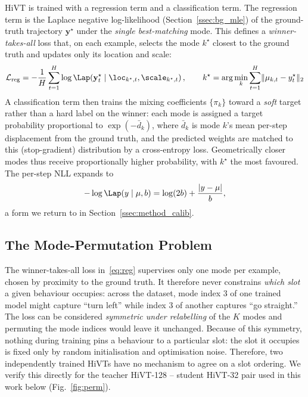 HiVT is trained with a regression term and a classification term. The regression
term is the Laplace negative log-likelihood (Section~\ref{ssec:bg_mle}) of the
ground-truth trajectory $\mathbf{y}^\star$ under the \emph{single best-matching}
mode. This defines a \emph{winner-takes-all} loss that, on each example, selects the mode
$k^\star$ closest to the ground truth and updates only its location and scale:
\begin{equation}
  \label{eq:reg}
  \mathcal{L}_{\mathrm{reg}}
    = -\frac{1}{H}\sum_{t=1}^{H}
       \log \Lap\!\left(\mathbf{y}^\star_t \mid \loc_{k^\star,t},\scale_{k^\star,t}\right),
  \qquad
  k^\star = \arg\min_k \sum_{t=1}^{H} \lVert \mu_{k,t} - y_t^\star \rVert_2
\end{equation}
A classification term then trains the mixing coefficients $\{\pi_k\}$ toward a
\emph{soft} target rather than a hard label on the winner: each mode is assigned a
target probability proportional to $\exp(-\bar{d}_k)$, where $\bar{d}_k$ is mode
$k$'s mean per-step displacement from the ground truth, and the predicted weights
are matched to this (stop-gradient) distribution by a cross-entropy loss.
Geometrically closer modes thus receive proportionally higher probability, with
$k^\star$ the most favoured. The per-step NLL expands to
\begin{equation}
  \label{eq:laplace_nll}
  -\log\Lap(y\mid\mu,b) = \log(2b) + \frac{|y-\mu|}{b},
\end{equation}
a form we return to in Section~\ref{ssec:method_calib}.

\subsection{The Mode-Permutation Problem}
\label{ssec:method_perm}
The winner-takes-all loss in~\eqref{eq:reg} supervises only one mode per example,
chosen by proximity to the ground truth. It therefore never constrains \emph{which
slot} a given behaviour occupies: across the dataset, mode index $3$ of one trained
model might capture ``turn left'' while index $3$ of another captures ``go
straight.'' The loss can be considered \emph{symmetric under relabelling} of the
$K$ modes and  permuting the mode indices would leave it unchanged. Because of 
this symmetry, nothing during training pins a behaviour to a particular slot: 
the slot it occupies is fixed only by random initialisation and optimisation noise.  
Therefore, two independently trained HiVTs have no mechanism to agree on a slot ordering.
We verify this directly for the teacher HiVT-128 -- student HiVT-32 pair used in this work below (Fig.~\ref{fig:perm}).


